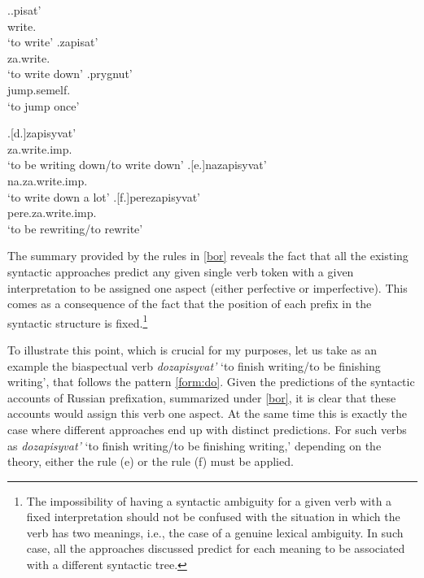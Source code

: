 \begin{minipage}{0.43\linewidth}
\vspace*{.5\baselineskip}
\ex.\label{ex:pred}\ag.\label{pred1}pisat'\textsuperscript{\IPF}\\
write.\\
`to write'
\bg.\label{pred2}zapisat'\textsuperscript{\PF}\\
za.write.\\
`to write down'
\bg.\label{pred3}prygnut'\textsuperscript{\PF}\\
jump.semelf.\\
`to jump once'

\vspace*{.5\baselineskip}
\end{minipage}%
\begin{minipage}{0.55\linewidth}
\vspace*{.5\baselineskip}
\exg.[d.]\label{pred4}zapisyvat'\textsuperscript{\IPF}\\
za.write.imp.\\
`to be writing down/to write down'
\bg.[e.]\label{pred5}nazapisyvat'\textsuperscript{\PF}\\
na.za.write.imp.\\
`to write down a lot'
\bg.[f.]\label{pred6}perezapisyvat'\textsuperscript{\IPF}\\
pere.za.write.imp.\\
`to be rewriting/to rewrite'

\vspace*{.5\baselineskip}
\end{minipage}

The summary provided by the rules in \ref{bor} reveals the fact that all the existing syntactic approaches predict any given single verb token with a given interpretation to be assigned one aspect (either perfective or imperfective). This comes as a consequence of the fact that the position of each prefix in the syntactic structure is fixed.\footnote{The impossibility of having a syntactic ambiguity for a given verb with a fixed interpretation should not be confused with the situation in which the verb has two meanings, i.e., the case of a genuine lexical ambiguity. In such case, all the approaches discussed predict for each meaning to be associated with a different syntactic tree.} 

To illustrate this point, which is crucial for my purposes, let us take as an example the biaspectual verb \textit{dozapisyvat'} `to finish writing/to be finishing writing', that follows the pattern \ref{form:do}. Given the predictions of the syntactic accounts of Russian prefixation, summarized under \ref{bor}, it is clear that these accounts would assign this verb one aspect. At the same time this is exactly the case where different approaches end up with distinct predictions. For such verbs as \textit{dozapisyvat'} `to finish writing/to be finishing writing,' depending on the theory, either the rule (e) or the rule (f) must be applied.

